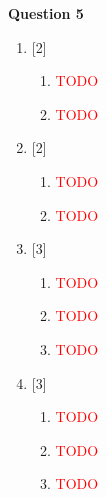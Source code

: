 \noindent
\textbf{Question 5}
\begin{enumerate}[label=(\roman*)]

    \item \hfill [2]
        \begin{enumerate}[label=(\alph*)]
            \item \textcolor{red}{TODO}
            \item \textcolor{red}{TODO}
        \end{enumerate}

    \item \hfill [2]
        \begin{enumerate}[label=(\alph*)]
            \item \textcolor{red}{TODO}
            \item \textcolor{red}{TODO}
        \end{enumerate}

    \item \hfill [3]
        \begin{enumerate}[label=(\alph*)]
            \item \textcolor{red}{TODO}
            \item \textcolor{red}{TODO}
            \item \textcolor{red}{TODO}
        \end{enumerate}

    \item \hfill [3]
        \begin{enumerate}[label=(\alph*)]
            \item \textcolor{red}{TODO}
            \item \textcolor{red}{TODO}
            \item \textcolor{red}{TODO}
        \end{enumerate}

\end{enumerate}

